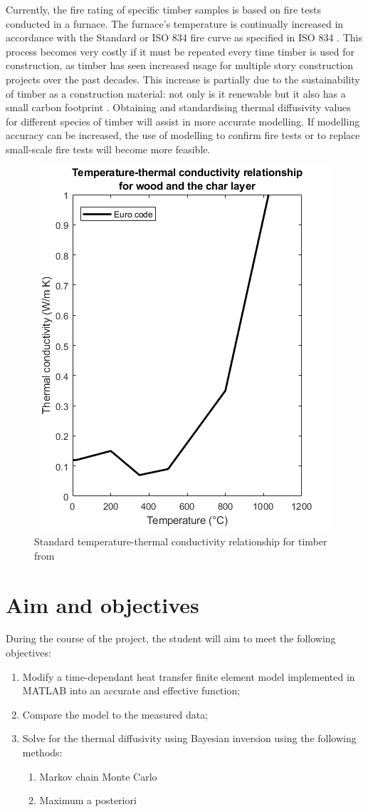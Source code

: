 Currently, the fire rating of specific timber samples is based on fire tests conducted in a furnace. 
The furnace's temperature is continually increased in accordance with the Standard or ISO 834 fire curve as specified in ISO 834 \citep{ISO:1999}.
This process becomes very costly if it must be repeated every time timber is used for construction, as timber has seen increased usage for multiple story construction projects over the past decades. 
This increase is partially due to the sustainability of timber as a construction material: not only is it renewable but it also has a small carbon footprint \citep{Salvadori:2017}.
Obtaining and standardising thermal diffusivity values for different species of timber will assist in more accurate modelling.
If modelling accuracy can be increased, the use of modelling to confirm fire tests or to replace small-scale fire tests will become more feasible.

	\begin{figure}
	\centering
	\includegraphics[width = 0.5\linewidth]{figures/Eurok.png}
	\caption{Standard temperature-thermal conductivity relationship for timber from \citep{Euro:2004}}
	\label{kvalue_fig}
	\end{figure}
	
	

\section{Aim and objectives}
During the course of the project, the student will aim to meet the following objectives:
\begin{enumerate}
 \item Modify a time-dependant heat transfer finite element model implemented in MATLAB into an accurate and effective function;
 \item Compare the model to the measured data;
 \item Solve for the thermal diffusivity using Bayesian inversion using the following methods:
 	\begin{enumerate}
 		\item Markov chain Monte Carlo 	
 		\item Maximum a posteriori 		
 	\end{enumerate}
\end{enumerate}


